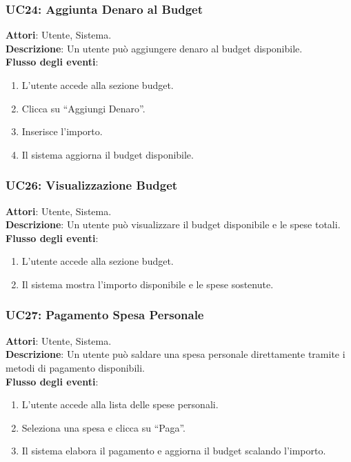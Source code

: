 \subsubsection{UC24: Aggiunta Denaro al Budget}
\textbf{Attori}: Utente, Sistema. \\
\textbf{Descrizione}: Un utente può aggiungere denaro al budget disponibile. \\
\textbf{Flusso degli eventi}:
\begin{enumerate}
    \item L’utente accede alla sezione budget.
    \item Clicca su ``Aggiungi Denaro''.
    \item Inserisce l’importo.
    \item Il sistema aggiorna il budget disponibile.
\end{enumerate}

\subsubsection{UC26: Visualizzazione Budget}
\textbf{Attori}: Utente, Sistema. \\
\textbf{Descrizione}: Un utente può visualizzare il budget disponibile e le spese totali. \\
\textbf{Flusso degli eventi}:
\begin{enumerate}
    \item L’utente accede alla sezione budget.
    \item Il sistema mostra l’importo disponibile e le spese sostenute.
\end{enumerate}

\subsubsection{UC27: Pagamento Spesa Personale}
\textbf{Attori}: Utente, Sistema. \\
\textbf{Descrizione}: Un utente può saldare una spesa personale direttamente tramite i metodi di pagamento disponibili. \\
\textbf{Flusso degli eventi}:
\begin{enumerate}
    \item L’utente accede alla lista delle spese personali.
    \item Seleziona una spesa e clicca su ``Paga''.
    \item Il sistema elabora il pagamento e aggiorna il budget scalando l’importo.
\end{enumerate}

